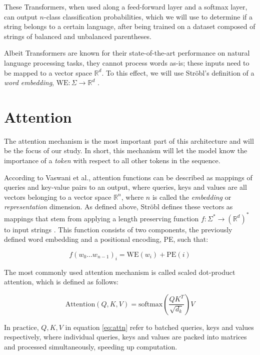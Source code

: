 These Transformers, when used along a feed-forward layer and a softmax layer, can output $n$-class classification probabilities, which we will use to determine if a string belongs to a certain language, after being trained on a dataset composed of strings of balanced and unbalanced parentheses.

Albeit Transformers are known for their state-of-the-art performance on natural language processing tasks, they cannot process words as-is; these inputs need to be mapped to a vector space $\mathbb{R}^d$. To this effect, we will use Ströbl's definition of a \emph{word embedding}, $\text{WE}: \Sigma \rightarrow \mathbb{R}^d$ \cite{strobl2024formal}. 

\section{Attention}

The attention mechanism is the most important part of this architecture and will be the focus of our study. In short, this mechanism will let the model know the importance of a \emph{token} with respect to all other tokens in the sequence. 

According to Vaswani et al., attention functions can be described as mappings of queries and key-value pairs to an output, where queries, keys and values are all vectors belonging to a vector space $\mathbb{R}^n$, where $n$ is called the \emph{embedding} or \emph{representation} dimension. As defined above, Ströbl defines these vectors as mappings that stem from applying a length preserving function $f: \Sigma^* \rightarrow (\mathbb{R}^d)^*$ to input strings \cite{strobl2024formal}. This function consists of two components, the previously defined word embedding and a positional encoding, PE, such that:

\begin{equation}
    f(w_0\dots w_{n-1})_i = \text{WE}(w_i) +\text{PE}(i)
\end{equation}

The most commonly used attention mechanism is called scaled dot-product attention, which is defined as follows:

\begin{equation} \label{eq:attn}
    \text{Attention}(Q, K, V) = \text{softmax}\left( \frac{QK^T}{\sqrt{d_k}} \right)V
\end{equation}

In practice, $Q, K, V$ in equation \ref{eq:attn} refer to batched queries, keys and values respectively, where individual queries, keys and values are packed into matrices and processed simultaneously, speeding up computation.

